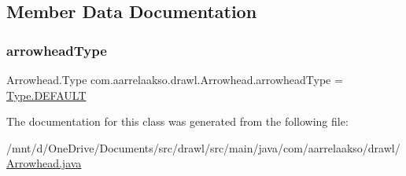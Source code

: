 \subsection{Member Data Documentation}
\mbox{\label{classcom_1_1aarrelaakso_1_1drawl_1_1_arrowhead_a72183bdf6672377d73b2d9810b6d0ed7}} 
\subsubsection{\texorpdfstring{arrowhead\+Type}{arrowheadType}}
{\footnotesize\ttfamily Arrowhead.\+Type com.\+aarrelaakso.\+drawl.\+Arrowhead.\+arrowhead\+Type = \hyperlink{enumcom_1_1aarrelaakso_1_1drawl_1_1_arrowhead_1_1_type_ae4c70d3cd0853637fba791f2bb29cd8e}{Type.\+D\+E\+F\+A\+U\+LT}\hspace{0.3cm}{\ttfamily [private]}}



The documentation for this class was generated from the following file\+:\begin{DoxyCompactItemize}
\item 
/mnt/d/\+One\+Drive/\+Documents/src/drawl/src/main/java/com/aarrelaakso/drawl/\hyperlink{_arrowhead_8java}{Arrowhead.\+java}\end{DoxyCompactItemize}
